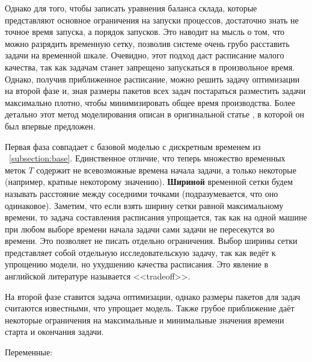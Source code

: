 \documentclass[12pt, twoside]{article}
\theoremstyle{definition}
\begin{document}
Однако для того, чтобы записать уравнения баланса склада, которые представляют основное ограничения на запуски процессов, достаточно знать не точное время запуска, а порядок запусков. Это наводит на мысль о том, что можно разрядить временную сетку, позволив системе очень грубо расставить задачи на временной шкале. Очевидно, этот подход даст расписание малого качества, так как задачам станет запрещено запускаться в произвольное время. Однако, получив приближенное расписание, можно решить задачу оптимизации на второй фазе и, зная размеры пакетов всех задач постараться разместить задачи максимально плотно, чтобы минимизировать общее время производства. Более детально этот метод моделирования описан в оригинальной статье \cite{lpheuristic}, в которой он был впервые предложен.

Первая фаза совпадает с базовой моделью с дискретным временем из ~\ref{subsection:base}. Единственное отличие, что теперь множество временных меток $T$ содержит не всевозможные времена начала задачи, а только некоторые (например, кратные некоторому значению). \textbf{Шириной} временной сетки будем называть расстояние между соседними точками (подразумевается, что оно одинаковое). Заметим, что если взять ширину сетки равной максимальному времени, то задача составления расписания упрощается, так как на одной машине при любом выборе времени начала задачи сами задачи не пересекутся во времени. Это позволяет не писать отдельно ограничения. Выбор ширины сетки представляет собой отдельную исследовательскую задачу, так как ведёт к упрощению модели, но ухудшению качества расписания. Это явление в английской литературе называется <<tradeoff>>.

На второй фазе ставится задача оптимизации, однако размеры пакетов для задач считаются известными, что упрощает модель. Также грубое приближение даёт некоторые ограничения на максимальные и минимальные значения времени старта и окончания задачи.

Переменные:
\end{document}
